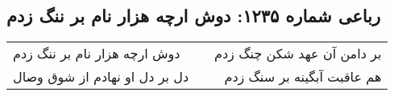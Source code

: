 \begin{center}
\section*{رباعی شماره ۱۲۳۵: دوش ارچه هزار نام بر ننگ زدم}
\label{sec:1235}
\begin{longtable}{l p{0.5cm} r}
دوش ارچه هزار نام بر ننگ زدم
&&
بر دامن آن عهد شکن چنگ زدم
\\
دل بر دل او نهادم از شوق وصال
&&
هم عاقبت آبگینه بر سنگ زدم
\\
\end{longtable}
\end{center}
